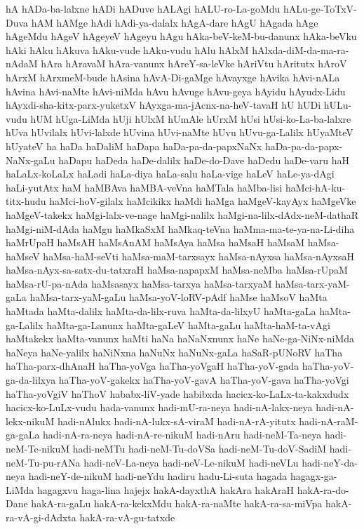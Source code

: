 {hA
hADa-ba-lalxne
hADi
hADuve
hALAgi
hALU-ro-La-goMdu
hALu-ge-ToTxV-Duva
hAM
hAMge
hAdi
hAdi-ya-dalalx
hAgA-dare
hAgU
hAgada
hAge
hAgeMdu
hAgeV
hAgeyeV
hAgeyu
hAgu
hAka-beV-keM-bu-danunx
hAka-beVku
hAki
hAku
hAkuva
hAku-vude
hAku-vudu
hAlu
hAlxM
hAlxda-diM-da-ma-ra-nAdaM
hAra
hAravaM
hAra-vanunx
hAreY-sa-leVke
hAriVtu
hAritutx
hAroV
hArxM
hArxmeM-bude
hAsina
hAvA-Di-gaMge
hAvayxge
hAvika
hAvi-nALa
hAvina
hAvi-naMte
hAvi-niMda
hAvu
hAvuge
hAvu-geya
hAyidu
hAyudx-Lidu
hAyxdi-sha-kitx-parx-yuketxV
hAyxga-ma-jAcnx-na-heV-tavaH
hU
hUDi
hULu-vudu
hUM
hUga-LiMda
hUji
hUlxM
hUmAle
hUrxM
hUsi
hUsi-ko-La-ba-lalxre
hUva
hUvilalx
hUvi-lalxde
hUvina
hUvi-naMte
hUvu
hUvu-ga-Lalilx
hUyaMteV
hUyateV
ha
haDa
haDaliM
haDapa
haDa-pa-da-papxNaNx
haDa-pa-da-papx-NaNx-gaLu
haDapu
haDeda
haDe-dalilx
haDe-do-Dave
haDedu
haDe-varu
haH
haLaLx-koLaLx
haLadi
haLa-diya
haLa-salu
haLa-vige
haLeV
haLe-ya-dAgi
haLi-yutAtx
haM
haMBAva
haMBA-veVna
haMTala
haMba-lisi
haMci-hA-ku-titx-hudu
haMci-hoV-gilalx
haMcikikx
haMdi
haMga
haMgeV-kayAyx
haMgeVke
haMgeV-takekx
haMgi-lalx-ve-nage
haMgi-nalilx
haMgi-na-lilx-dAdx-neM-dathaR
haMgi-niM-dAda
haMgu
haMkaSxM
haMkaq-teVna
haMma-ma-te-ya-na-Li-diha
haMrUpaH
haMsAH
haMsAnAM
haMsAya
haMsa
haMsaH
haMsaM
haMsa-haMseV
haMsa-haM-seVti
haMsa-maM-tarxsayx
haMsa-nAyxsa
haMsa-nAyxsaH
haMsa-nAyx-sa-satx-du-tatxraH
haMsa-napapxM
haMsa-neMba
haMsa-rUpaM
haMsa-rU-pa-nAda
haMsasayx
haMsa-tarxya
haMsa-tarxyaM
haMsa-tarx-yaM-gaLa
haMsa-tarx-yaM-gaLu
haMsa-yoV-loRV-pAdf
haMse
haMsoV
haMta
haMtada
haMta-dalilx
haMta-da-lilx-ruva
haMta-da-lilxyU
haMta-gaLa
haMta-ga-Lalilx
haMta-ga-Lanunx
haMta-gaLeV
haMta-gaLu
haMta-haM-ta-vAgi
haMtakekx
haMta-vanunx
haMti
haNa
haNaNxnunx
haNe
haNe-ga-NiNx-niMda
haNeya
haNe-yalilx
haNiNxna
haNuNx
haNuNx-gaLa
haSaR-pUNoRV
haTha
haTha-parx-dhAnaH
haTha-yoVga
haTha-yoVgaH
haTha-yoV-gada
haTha-yoV-ga-da-lilxya
haTha-yoV-gakekx
haTha-yoV-gavA
haTha-yoV-gava
haTha-yoVgi
haTha-yoVgiV
haThoV
hababx-liV-yade
habibxda
hacicx-ko-LaLx-ta-kakxdudx
hacicx-ko-LuLx-vudu
hada-vanunx
hadi-mU-ra-neya
hadi-nA-lakx-neya
hadi-nA-lekx-nikuM
hadi-nAlukx
hadi-nA-lukx-sA-viraM
hadi-nA-rA-yitutx
hadi-nA-raM-ga-gaLa
hadi-nA-ra-neya
hadi-nA-re-nikuM
hadi-nAru
hadi-neM-Ta-neya
hadi-neM-Te-nikuM
hadi-neMTu
hadi-neM-Tu-doVSa
hadi-neM-Tu-doV-SadiM
hadi-neM-Tu-pu-rANa
hadi-neV-La-neya
hadi-neV-Le-nikuM
hadi-neVLu
hadi-neY-da-neya
hadi-neY-de-nikuM
hadi-neYdu
hadiru
hadu-Li-suta
hagada
hagagx-ga-LiMda
hagagxvu
haga-lina
hajejx
hakA-dayxthA
hakAra
hakAraH
hakA-ra-do-Dane
hakA-ra-gaLu
hakA-ra-kekxMdu
hakA-ra-naMte
hakA-ra-sa-miVpa
hakA-ra-vA-gi-dAdxta
hakA-ra-vA-gu-tatxde
}
